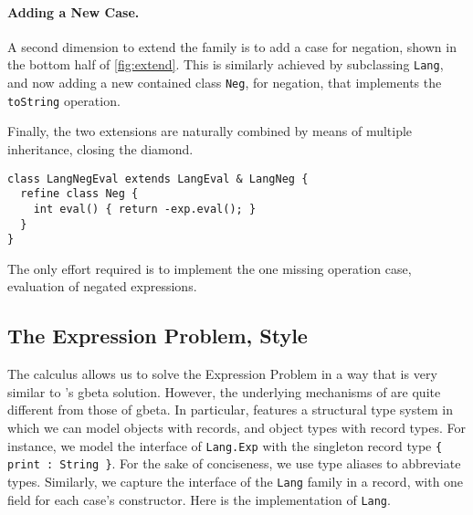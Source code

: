 \paragraph{Adding a New Case.}
A second dimension to extend the family is to add a case for negation, shown in
the bottom half of \cref{fig:extend}. This is similarly achieved by subclassing
\lstinline{Lang}, and now adding a new contained class \lstinline{Neg}, for
negation, that implements the \lstinline{toString} operation.

Finally, the two extensions are naturally combined by means of
multiple inheritance, closing the diamond.
\begin{lstlisting}[language=gbeta]
class LangNegEval extends LangEval & LangNeg {
  refine class Neg {
    int eval() { return -exp.eval(); }
  }
}
\end{lstlisting}
The only effort required is to implement the one missing operation
case, evaluation of negated expressions.


\subsection{The Expression Problem, \name Style}

The \name calculus allows us to solve the Expression Problem in a way that is
very similar to \citeauthor{Ernst_2001}'s gbeta solution. However, the underlying mechanisms of
\name are quite different from those of gbeta. In particular, \name features a
structural type system in which we can model objects with records, and object
types with record types. For instance, we model the interface of \lstinline{Lang.Exp}
with the singleton record type \lstinline${ print : String }$. For the sake of
conciseness, we use type aliases to abbreviate types.
Similarly, we capture the interface of the \lstinline{Lang} family in a record,
with one field for each case's constructor.
Here is the implementation of \lstinline{Lang}.

